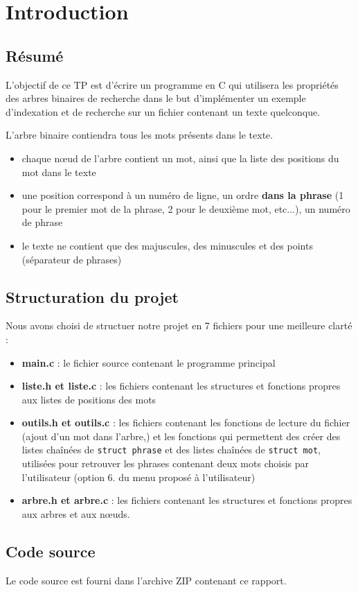\chapter{Introduction}
\section{Résumé}
L'objectif de ce TP est d'écrire un programme en C qui utilisera les propriétés des arbres binaires de recherche dans le but d'implémenter un exemple d'indexation et de recherche sur un fichier contenant un texte quelconque.

\medskip

\noindent L'arbre binaire contiendra tous les mots présents dans le texte.
\begin{itemize}
  \item chaque n\oe ud de l'arbre contient un mot, ainsi que la liste des positions du mot dans le texte
  \item une position correspond à un numéro de ligne, un ordre \textbf{dans la phrase} (1 pour le premier mot de la phrase, 2 pour le deuxième mot, etc...), un numéro de phrase
  \item le texte ne contient que des majuscules, des minuscules et des points (séparateur de phrases)
\end{itemize}

\section{Structuration du projet}
Nous avons choisi de structuer notre projet en 7 fichiers pour une meilleure clarté :

\begin{itemize}
  \item \textbf{main.c} : le fichier source contenant le programme principal
  \item \textbf{liste.h et liste.c} : les fichiers contenant les structures et fonctions propres aux listes de positions des mots
  \item \textbf{outils.h et outils.c} : les fichiers contenant les fonctions de lecture du fichier (ajout d'un mot dans l'arbre,) et les fonctions qui permettent des créer des listes chaînées de \lstinline{struct phrase} et des listes chaînées de \lstinline{struct mot}, utilisées pour retrouver les phrases contenant deux mots choisis par l'utilisateur (option 6. du menu proposé à l'utilisateur)
  \item \textbf{arbre.h et arbre.c} : les fichiers contenant les structures et fonctions propres aux arbres et aux n\oe uds.
\end{itemize}

\section{Code source}
Le code source est fourni dans l'archive ZIP contenant ce rapport.